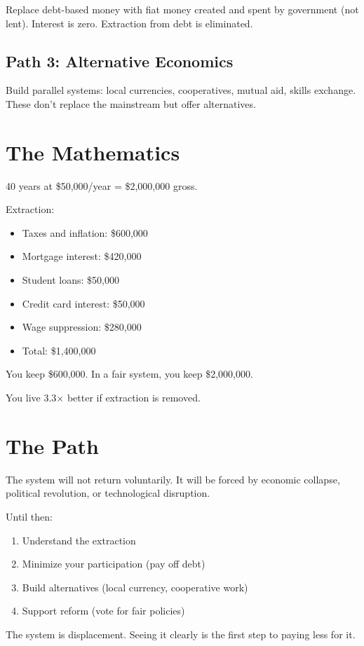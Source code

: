 \documentclass[12pt]{article}
\begin{document}
Replace debt-based money with fiat money created and spent by government (not lent). Interest is zero. Extraction from debt is eliminated.

\subsection{Path 3: Alternative Economics}

Build parallel systems: local currencies, cooperatives, mutual aid, skills exchange. These don't replace the mainstream but offer alternatives.

\section{The Mathematics}

40 years at \$50,000/year = \$2,000,000 gross.

Extraction:
\begin{itemize}
\item Taxes and inflation: \$600,000
\item Mortgage interest: \$420,000
\item Student loans: \$50,000
\item Credit card interest: \$50,000
\item Wage suppression: \$280,000
\item Total: \$1,400,000
\end{itemize}

You keep \$600,000. In a fair system, you keep \$2,000,000.

You live 3.3× better if extraction is removed.

\section{The Path}

The system will not return voluntarily. It will be forced by economic collapse, political revolution, or technological disruption.

Until then:
\begin{enumerate}
\item Understand the extraction
\item Minimize your participation (pay off debt)
\item Build alternatives (local currency, cooperative work)
\item Support reform (vote for fair policies)
\end{enumerate}

The system is displacement. Seeing it clearly is the first step to paying less for it.
\end{document}
